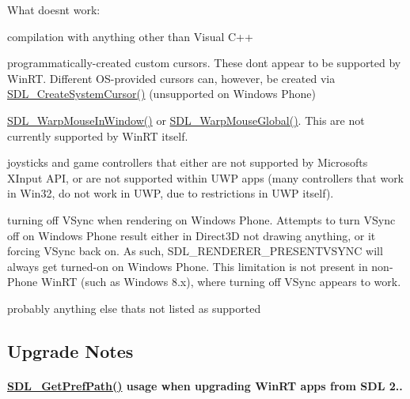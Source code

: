 \begin{DoxyItemize}
\begin{DoxyItemize}
\end{DoxyItemize}
\item What doesn\textquotesingle{}t work\+:
\begin{DoxyItemize}
\item compilation with anything other than Visual C++
\item programmatically-\/created custom cursors. These don\textquotesingle{}t appear to be supported by Win\+RT. Different O\+S-\/provided cursors can, however, be created via \mbox{\hyperlink{_s_d_l__mouse_8h_a217c89743b3da84b9656304f8e4ca51e}{S\+D\+L\+\_\+\+Create\+System\+Cursor()}} (unsupported on Windows Phone)
\item \mbox{\hyperlink{_s_d_l__mouse_8h_a2f2259cdf30272b3c4cc1e3236cb8071}{S\+D\+L\+\_\+\+Warp\+Mouse\+In\+Window()}} or \mbox{\hyperlink{_s_d_l__mouse_8h_a200c3d105a0a30fb465760ab870b3ce3}{S\+D\+L\+\_\+\+Warp\+Mouse\+Global()}}. This are not currently supported by Win\+RT itself.
\item joysticks and game controllers that either are not supported by Microsoft\textquotesingle{}s X\+Input A\+PI, or are not supported within U\+WP apps (many controllers that work in Win32, do not work in U\+WP, due to restrictions in U\+WP itself).
\item turning off V\+Sync when rendering on Windows Phone. Attempts to turn V\+Sync off on Windows Phone result either in Direct3D not drawing anything, or it forcing V\+Sync back on. As such, S\+D\+L\+\_\+\+R\+E\+N\+D\+E\+R\+E\+R\+\_\+\+P\+R\+E\+S\+E\+N\+T\+V\+S\+Y\+NC will always get turned-\/on on Windows Phone. This limitation is not present in non-\/\+Phone Win\+RT (such as Windows 8.\+x), where turning off V\+Sync appears to work.
\item probably anything else that\textquotesingle{}s not listed as supported
\end{DoxyItemize}
\end{DoxyItemize}

\subsection*{Upgrade Notes }

\paragraph*{\mbox{\hyperlink{_s_d_l__filesystem_8h_ab11eaf74d913eefb472475f0c8e312ce}{S\+D\+L\+\_\+\+Get\+Pref\+Path()}} usage when upgrading Win\+RT apps from S\+DL 2..}

